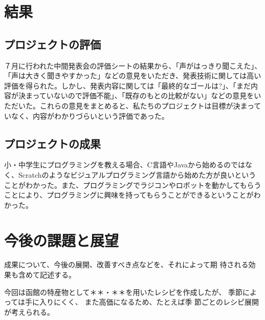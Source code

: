 \documentclass[openany,11pt,papersize]{jsbook}
\begin{document}
\chapter{結果}

\section{プロジェクトの評価}
７月に行われた中間発表会の評価シートの結果から、「声がはっきり聞こえた」、「声は大きく聞きやすかった」などの意見をいただき、発表技術に関しては高い評価を得られた。しかし、発表内容に関しては「最終的なゴールは?」、「まだ内容が決まっていないので評価不能」、「既存のもとの比較がない」などの意見をいただいた。これらの意見をまとめると、私たちのプロジェクトは目標が決まっていなく、内容がわかりづらいという評価であった。

\section{プロジェクトの成果}
小・中学生にプログラミングを教える場合、C言語やJavaから始めるのではなく、Scratchのようなビジュアルプログラミング言語から始めた方が良いということがわかった。また、プログラミングでラジコンやロボットを動かしてもらうことにより、プログラミングに興味を持ってもらうことができるということがわかった。


\chapter{今後の課題と展望}
\begin{hissu}
成果について、今後の展開、改善すべき点などを、それによって期
待される効果も含めて記述する。
\end{hissu}

今回は函館の特産物として＊＊・＊＊を用いたレシピを作成したが、
季節によっては手に入りにくく、 また高価になるため、たとえば季
節ごとのレシピ展開が考えられる。 

\end{document}
